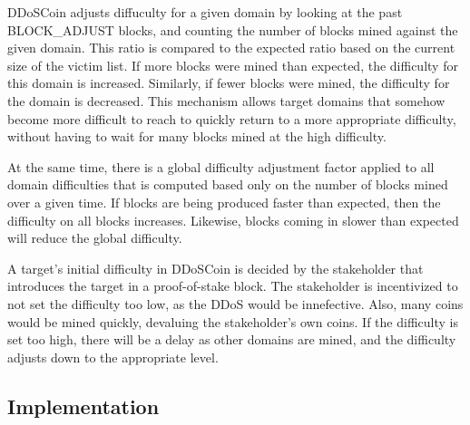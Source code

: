 DDoSCoin adjusts diffuculty for a given domain by looking at the past
BLOCK\_ADJUST blocks, and counting the number of blocks mined against
the given domain. This ratio is compared to the expected ratio based on the
current size of the victim list. If more blocks were mined than expected, the
difficulty for this domain is increased. Similarly, if fewer blocks were mined,
the difficulty for the domain is decreased.
This mechanism allows target domains that somehow become more
difficult to reach to quickly return to a more appropriate difficulty, without
having to wait for many blocks mined at the high difficulty. 

At the same time, there is a global difficulty adjustment factor applied to all
domain difficulties that is computed based only on the number of blocks mined
over a given time. If blocks are being produced faster than expected, then the
difficulty on all blocks increases. Likewise, blocks coming in slower than
expected will reduce the global difficulty.


%


A target's initial difficulty in DDoSCoin is decided by the stakeholder that
introduces the target in a proof-of-stake block. The stakeholder is incentivized to not
set the difficulty too low, as the DDoS would be innefective. Also, many coins would be
mined quickly, devaluing the stakeholder's own coins. If the difficulty is set too high,
there will be a delay as other domains are mined, and the difficulty adjusts down
to the appropriate level. 








\subsection{Implementation}

